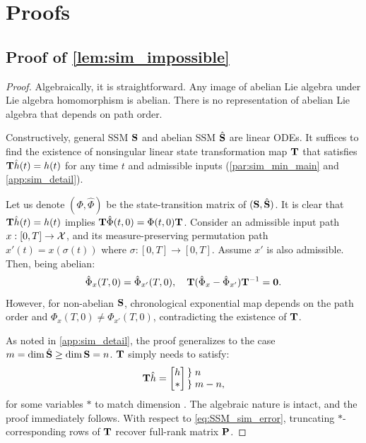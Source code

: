 \section{Proofs}
\label{app:proof}
\subsection{Proof of \cref{lem:sim_impossible}}
\label{app:sim_impossible_proof}
\begin{proof}
    Algebraically, it is straightforward.
    Any image of abelian Lie algebra under Lie algebra homomorphism is abelian.
    There is no representation of abelian Lie algebra that depends on path order.
    
    Constructively, general SSM $\mathbf{S}$ and abelian SSM $\hat{\mathbf{S}}$ are linear ODEs.
    It suffices to find the existence of nonsingular linear state transformation map $\mathbf{T}$
    that satisfies $\mathbf{T}\hat{h}(t) = h(t)$ for any time $t$ and admissible inputs
    (\cref{par:sim_min_main} and \cref{app:sim_detail}).

    Let us denote $(\Phi, \hat{\Phi})$ be the state-transition matrix of $(\mathbf{S}, \hat{\mathbf{S}})$.
    It is clear that $\mathbf{T}\hat{h}(t) = h(t)$ implies $\mathbf{T}\hat{\Phi}(t,0) = \Phi(t,0)\mathbf{T}$.
    Consider an admissible input path $x: [0,T] \to \mathcal{X}$,
    and its measure-preserving permutation path $x'(t)= x(\sigma(t))$
    where $\sigma:[0,T] \to [0,T]$.
    Assume $x'$ is also admissible.
    Then, being abelian:
    \begin{equation*}
        \hat{\Phi}_{x}(T,0) = \hat{\Phi}_{x'}(T,0),
        \quad
        \mathbf{T}(\hat{\Phi}_{x}-\hat{\Phi}_{x'})\mathbf{T}^{-1} = \mathbf{0}.
    \end{equation*}
    However, for non-abelian $\mathbf{S}$, chronological exponential map depends on the path order and $\Phi_{x}(T,0) \neq \Phi_{x'}(T,0)$,
    contradicting the existence of $\mathbf{T}$.
    
    As noted in \cref{app:sim_detail}, the proof generalizes to the case $m = \dim \hat{\mathbf{S}} \ge \dim \mathbf{S} = n$.
    $\mathbf{T}$ simply needs to satisfy:
    \begin{equation*}
        \mbf{T}\hat{h} = \begin{bmatrix}
            h \\
            *
        \end{bmatrix}
        \begin{matrix*}[l]
            \rbrace \; n \\
            \rbrace \; m-n,
        \end{matrix*}
    \end{equation*}
    for some variables $*$ to match dimension \cite{toth2010modeling}.
    The algebraic nature is intact, and the proof immediately follows.
    With respect to \cref{eq:SSM_sim_error},
    truncating $*$-corresponding rows of $\mathbf{T}$ recover full-rank matrix $\mathbf{P}$.
\end{proof}
